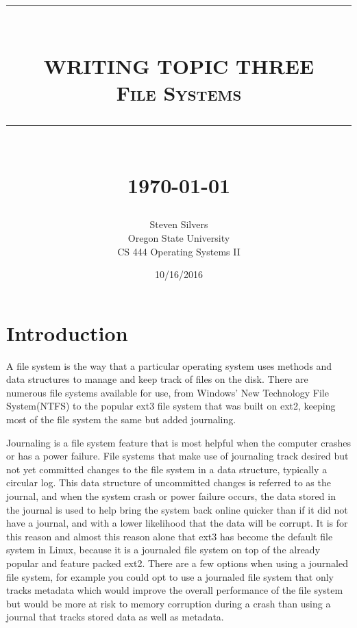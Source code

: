 \documentclass[10pt,serif,draftclsnofoot,onecolumn]{IEEEtran}
\newcommand{\HRule}[1]{\rule{\linewidth}{#1}}
\begin{document}
	\begin{titlepage}


	\title{ \normalsize \textsc{}
			\\ [2.0cm]
			\HRule{0.5pt} \\
			\LARGE \textbf{\uppercase{Writing topic three}}
			\\ \normalsize \textsc{File Systems}
			\HRule{2pt} \\ [0.5cm]
			\normalsize \today \vspace*{5\baselineskip}}
	\date{10/16/2016}
	
	\author{Steven Silvers \\
			Oregon State University \\
			CS 444 Operating Systems II}
	\maketitle
	\end{titlepage}
	\newpage
	\section{Introduction}
	\par
			A file system is the way that a particular operating system uses methods and data structures to manage and keep track of files on the disk\cite{1}. There are numerous file systems available for use, from Windows' New Technology File System(NTFS) to the popular ext3 file system that was built on ext2, keeping most of the file system the same but added journaling.
	\newline
	\par
			Journaling is a file system feature that is most helpful when the computer crashes or has a power failure. File systems that make use of journaling track desired but not  yet committed changes to the file system in a data structure, typically a circular log\cite{2}. This data structure of uncommitted changes is referred to as the journal, and when the system crash or power failure occurs, the data stored in the journal is used to help bring the system back online quicker than if it did not have a journal, and with a lower likelihood that the data will be corrupt. It is for this reason and almost this reason alone that ext3 has become the default file system in Linux, because it is a journaled file system on top of the already popular and feature packed ext2\cite{1}. There are a few options when using a journaled file system, for example you could opt to use a journaled file system that only tracks metadata which would improve the overall performance of the file system but would be more at risk to memory corruption during a crash than using a journal that tracks stored data as well as metadata.
	\newline
\end{document}
